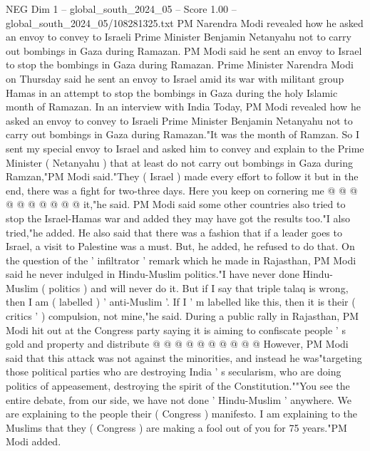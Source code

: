\begin{textsample}{NEG Dim 1 – global\_south\_2024\_05 – Score 1.00 – global\_south\_2024\_05/108281325.txt}  \label{ex:f1_neg_378}
PM Narendra Modi revealed how he asked an envoy to convey to Israeli Prime Minister Benjamin Netanyahu not to carry out bombings in Gaza during Ramazan.
PM Modi said he sent an envoy to Israel to stop the bombings in Gaza during Ramazan.
Prime Minister Narendra Modi on Thursday said he sent an envoy to Israel amid its war with militant group Hamas in an attempt to stop the bombings in Gaza during the holy Islamic month of Ramazan.
In an interview with India Today, PM Modi revealed how he asked an envoy to convey to Israeli Prime Minister Benjamin Netanyahu not to carry out bombings in Gaza during Ramazan."It was the month of Ramzan.
So I sent my special envoy to Israel and asked him to convey and explain to the Prime Minister ( Netanyahu ) that at least do not carry out bombings in Gaza during Ramzan,"PM Modi said."They ( Israel ) made every effort to follow it but in the end, there was a fight for two-three days.
Here you keep on cornering me @ @ @ @ @ @ @ @ @ @ it,"he said.
PM Modi said some other countries also tried to stop the Israel-Hamas war and added they may have got the results too."I also tried,"he added.
He also said that there was a fashion that if a leader goes to Israel, a visit to Palestine was a must.
But, he added, he refused to do that.
On the question of the ' infiltrator ' remark which he made in Rajasthan, PM Modi said he never indulged in Hindu-Muslim politics."I have never done Hindu-Muslim ( politics ) and will never do it.
But if I say that triple talaq is wrong, then I am ( labelled ) ' anti-Muslim '.
If I ' m labelled like this, then it is their ( critics ' ) compulsion, not mine,"he said.
During a public rally in Rajasthan, PM Modi hit out at the Congress party saying it is aiming to confiscate people ' s gold and property and distribute @ @ @ @ @ @ @ @ @ @ However, PM Modi said that this attack was not against the minorities, and instead he was"targeting those political parties who are destroying India ' s secularism, who are doing politics of appeasement, destroying the spirit of the Constitution.""You see the entire debate, from our side, we have not done ' Hindu-Muslim ' anywhere.
We are explaining to the people their ( Congress ) manifesto.
I am explaining to the Muslims that they ( Congress ) are making a fool out of you for 75 years."PM Modi added.

\end{textsample}
